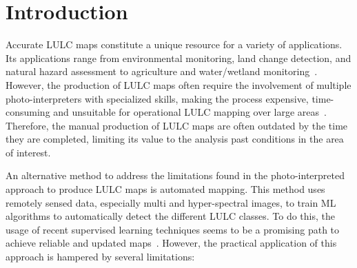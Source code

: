 \chapter{Introduction}
\graphicspath{{figures/introduction/}}

Accurate LULC maps constitute a unique resource for a variety of applications.
Its applications range from environmental monitoring, land change detection,
and natural hazard assessment to agriculture and water/wetland
monitoring~\cite{Khatami2016}. However, the production of LULC maps often
require the involvement of multiple photo-interpreters with specialized
skills, making the process expensive, time-consuming and unsuitable for
operational LULC mapping over large areas~\cite{Douzas2019rs}. Therefore, the
manual production of LULC maps are often outdated by the time they are
completed, limiting its value to the analysis past conditions in the area of
interest.

An alternative method to address the limitations found in the
photo-interpreted approach to produce LULC maps is automated mapping. This
method uses remotely sensed data, especially multi and hyper-spectral images,
to train ML algorithms to automatically detect the different LULC classes.  To
do this, the usage of recent supervised learning techniques seems to be a
promising path to achieve reliable and updated
maps~\cite{tewkesbury2015critical}. However, the practical application of this
approach is hampered by several limitations: 

